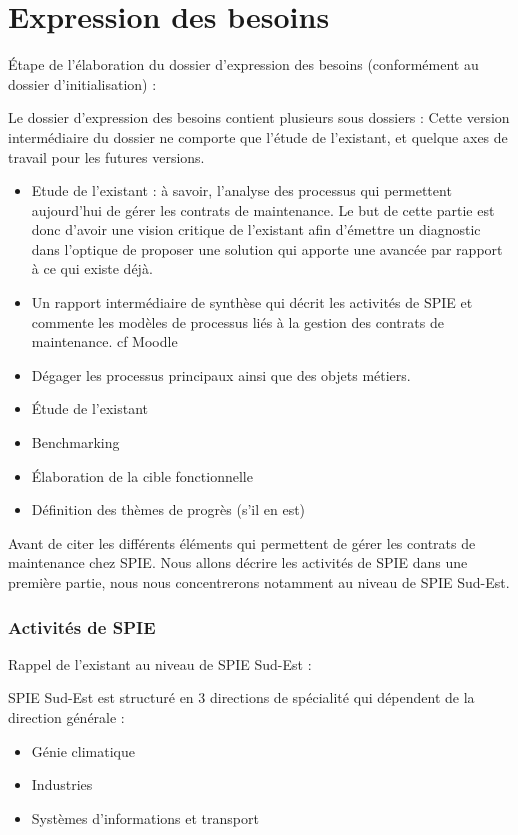 \part{Expression des besoins}

Étape de l’élaboration du dossier d'expression des besoins (conformément au dossier d’initialisation) : 

Le dossier d’expression des besoins contient plusieurs sous dossiers : Cette version intermédiaire du dossier ne comporte que l’étude de l’existant, et quelque axes de travail pour les futures versions.

\begin{itemize}
\item Etude de l’existant : à savoir, l’analyse des processus qui permettent aujourd’hui de gérer les contrats de maintenance. Le but de cette partie est donc d’avoir une vision critique de l’existant afin d’émettre un diagnostic dans l’optique de proposer une solution qui apporte une avancée par rapport à  ce qui existe déjà.
\item Un rapport intermédiaire de synthèse qui décrit les activités de SPIE et commente les modèles de processus liés à la gestion des contrats de maintenance. cf Moodle
\item Dégager les processus principaux ainsi que des objets métiers.
\item Étude de l’existant
\item Benchmarking
\item Élaboration de la cible fonctionnelle
\item Définition des thèmes de progrès (s’il en est)
\end{itemize}

Avant de citer les différents éléments qui permettent de gérer les contrats de maintenance chez SPIE. Nous allons décrire les activités de SPIE dans une première partie, nous nous concentrerons notamment au niveau de SPIE Sud-Est.

\section{Activités de SPIE}

Rappel de l’existant au niveau de SPIE Sud-Est :

SPIE Sud-Est est structuré en 3 directions de spécialité qui dépendent de la direction générale :

\begin{itemize}
\item Génie climatique
\item Industries
\item Systèmes d’informations et transport
\end{itemize}

